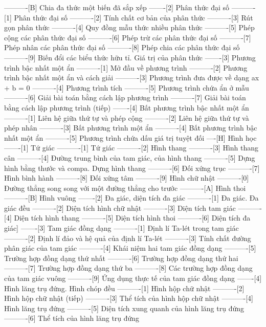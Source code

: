 ----------[B] Chia đa thức một biến đã sắp xếp
-------[2] Phân thức đại số
----------[1] Phân thức đại số
----------[2] Tính chất cơ bản của phân thức
----------[3] Rút gọn phân thức
----------[4] Quy đồng mẫu thức nhiều phân thức
----------[5] Phép cộng các phân thức đại số
----------[6] Phép trừ các phân thức đại số
----------[7] Phép nhân các phân thức đại số
----------[8] Phép chia các phân thức đại số
----------[9] Biến đổi các biểu thức hữu tỉ. Giá trị của phân thức
-------[3] Phương trình bậc nhất một ẩn
----------[1] Mở đầu về phương trình
----------[2] Phương trình bậc nhất một ẩn và cách giải
----------[3] Phương trình đưa được về dạng ax + b = 0
----------[4] Phương trình tích
----------[5] Phương trình chứa ẩn ở mẫu
----------[6] Giải bài toán bằng cách lập phương trình
----------[7] Giải bài toán bằng cách lập phương trình (tiếp)
-------[4] Bất phương trình bậc nhất một ẩn
----------[1] Liên hệ giữa thứ tự và phép cộng
----------[2] Liên hệ giữa thứ tự và phép nhân
----------[3] Bất phương trình một ẩn
----------[4] Bất phương trình bậc nhất một ẩn
----------[5] Phương trình chứa dấu giá trị tuyệt đối
----[H] Hình học
-------[1] Tứ giác
----------[1] Tứ giác
----------[2] Hình thang
----------[3] Hình thang cân
----------[4] Đường trung bình của tam giác, của hình thang
----------[5] Dựng hình bằng thước và compa. Dựng hình thang
----------[6] Đối xứng trục
----------[7] Hình bình hành
----------[8] Đối xứng tâm
----------[9] Hình chữ nhật
----------[0] Đường thẳng song song với một đường thẳng cho trước
----------[A] Hình thoi
----------[B] Hình vuông
-------[2] Đa giác, diện tích đa giác
----------[1] Đa giác. Đa giác đều
----------[2] Diện tích hình chữ nhật
----------[3] Diện tích tam giác
----------[4] Diện tích hình thang
----------[5] Diện tích hình thoi
----------[6] Diện tích đa giác]
-------[3] Tam giác đồng dạng
----------[1] Định lí Ta-lét trong tam giác
----------[2] Định lí đảo và hệ quả của định lí Ta-lét
----------[3] Tính chất đường phân giác của tam giác
----------[4] Khái niệm hai tam giác đồng dạng
----------[5] Trường hợp đồng dạng thứ nhất
----------[6] Trường hợp đồng dạng thứ hai
----------[7] Trường hợp đồng dạng thứ ba
----------[8] Các trường hợp đồng dạng của tam giác vuông
----------[9] Ứng dụng thực tế của tam giác đồng dạng
-------[4] Hình lăng trụ đứng. Hình chóp đều
----------[1] Hình hộp chữ nhật
----------[2] Hình hộp chữ nhật (tiếp)
----------[3] Thể tích của hình hộp chữ nhật
----------[4] Hình lăng trụ đứng
----------[5] Diện tích xung quanh của hình lăng trụ đứng
----------[6] Thể tích của hình lăng trụ đứng
